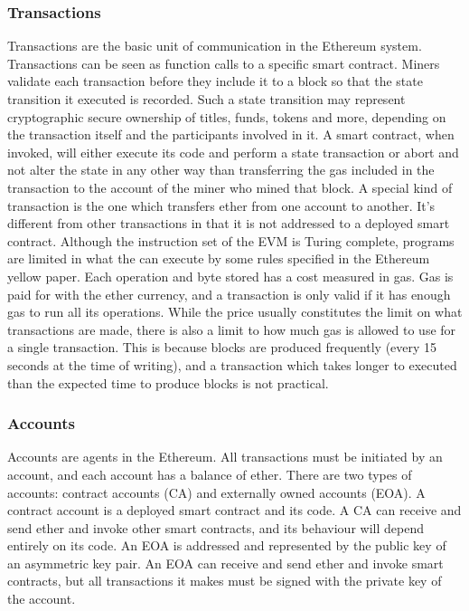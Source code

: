 \subsubsection{Transactions}
Transactions are the basic unit of communication in the Ethereum system. Transactions can be seen as function calls to a specific smart contract. Miners validate each transaction before they include it to a block so that the state transition it executed is recorded. Such a state transition may represent cryptographic secure ownership of titles, funds, tokens and more, depending on the transaction itself and the participants involved in it. A smart contract, when invoked, will either execute its code and perform a state transaction or abort and not alter the state in any other way than transferring the gas included in the transaction to the account of the miner who mined that block. A special kind of transaction is the one which transfers ether from one account to another. It's different from other transactions in that it is not addressed to a deployed smart contract.
Although the instruction set of the EVM is Turing complete, programs are limited in what the can execute by some rules specified in the Ethereum yellow paper. Each operation and byte stored has a cost measured in gas. Gas is paid for with the ether currency, and a transaction is only valid if it has enough gas to run all its operations. While the price usually constitutes the limit on what transactions are made, there is also a limit to how much gas is allowed to use for a single transaction. This is because blocks are produced frequently (every 15 seconds at the time of writing), and a transaction which takes longer to executed than the expected time to produce blocks is not practical. 

\subsubsection{Accounts}
Accounts are agents in the Ethereum. All transactions must be initiated by an account, and each account has a balance of ether. There are two types of accounts: contract accounts (CA) and externally owned accounts (EOA). A contract account is a deployed smart contract and its code. A CA can receive and send ether and invoke other smart contracts, and its behaviour will depend entirely on its code. An EOA is addressed and represented by the public key of an asymmetric key pair. An EOA can receive and send ether and invoke smart contracts, but all transactions it makes must be signed with the private key of the account. 

